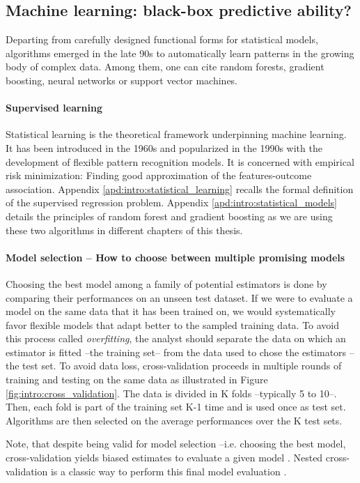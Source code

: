\documentclass[french,12pt,twoside,a4paper]{book}
\begin{document}
\begin{background_box_left}

  \subsection{Machine learning: black-box predictive ability?}\label{subsec:intro:machine_learning}

  Departing from carefully designed functional forms for statistical models,
  algorithms emerged in the late 90s to automatically learn patterns in the
  growing body of complex data. Among them, one can cite random forests,
  gradient boosting, neural networks or support vector machines.

  \paragraph{Supervised learning}

  Statistical learning \citep{vapnik1999nature} is the theoretical framework
  underpinning machine learning. It has been introduced in the 1960s and
  popularized in the 1990s with the development of flexible pattern recognition
  models. It is concerned with empirical risk minimization: Finding good
  approximation of the features-outcome association. Appendix
  \ref{apd:intro:statistical_learning} recalls the formal definition of the
  supervised regression problem. Appendix \ref{apd:intro:statistical_models}
  details the principles of random forest and gradient boosting as we are
  using these two algorithms in different chapters of this thesis.

  \paragraph{Model selection -- How to choose between multiple promising models}

  Choosing the best model among a family of potential estimators is done by
  comparing their performances on an unseen test dataset. If we were to evaluate
  a model on the same data that it has been trained on, we would systematically
  favor flexible models that adapt better to the sampled training data. To avoid
  this process called \emph{overfitting}, the analyst should separate the data
  on which an estimator is fitted --the training set-- from the data used to
  chose the estimators --the test set. To avoid data loss, cross-validation
  \citep{stone1974cross} proceeds in multiple rounds of training and testing on
  the same data as illustrated in Figure \ref{fig:intro:cross_validation}. The
  data is divided in K folds --typically 5 to 10--. Then, each fold is part of
  the training set K-1 time and is used once as test set. Algorithms are then
  selected on the average performances over the K test sets.

  Note, that despite being valid for model selection --i.e. choosing the best model,
  cross-validation yields biased estimates to evaluate a given model
  \citep{wager2020cross}. Nested cross-validation is a classic way to perform
  this final model evaluation \citep{varoquaux2017assessing}.

\end{background_box_left}
\end{document}
